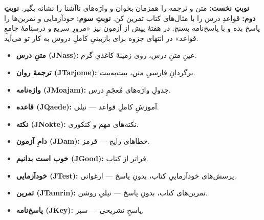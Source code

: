 \begin{JGood}
\textbf{نوبتِ نخست:} متن و ترجمه را همزمان بخوان و واژه‌های ناآشنا را نشانه بگیر.
\textbf{نوبتِ دوم:} قواعدِ درس را با مثال‌های کتاب تمرین کن. \textbf{نوبتِ سوم:}
خودآزمایی و تمرین‌ها را پاسخ بده و با پاسخ‌نامه بسنج. در هفتهٔ پیش از آزمون نیز
«مرورِ سریع و درسنامهٔ جامعِ قواعد» در انتهای جزوه برای بازبینیِ کاملِ دروس به
کار تو می‌آید.
\end{JGood}

\begin{JLegend}
\begin{itemize}
  \item \textbf{متنِ درس (JNass):} عینِ متنِ درس، روی زمینهٔ کاغذیِ گرم.
  \item \textbf{ترجمهٔ روان (JTarjome):} برگردانِ فارسیِ متن، بیت‌به‌بیت.
  \item \textbf{واژه‌نامه (JMoajam):} جدولِ واژه‌های مُعجَمِ درس.
  \item \textbf{قاعده (JQaede):} آموزشِ کاملِ قواعد — نیلی.
  \item \textbf{نکته (JNokte):} نکته‌های مهم و کنکوری.
  \item \textbf{دامِ آزمون (JDam):} خطاهای رایج — قرمز.
  \item \textbf{خوب است بدانیم (JGood):} فراتر از کتاب.
  \item \textbf{خودآزمایی (JTest):} پرسش‌های خودآزماییِ کتاب، بدونِ پاسخ — ارغوانی.
  \item \textbf{تمرین (JTamrin):} تمرین‌های کتاب، بدونِ پاسخ — نیلیِ روشن.
  \item \textbf{پاسخ‌نامه (JKey):} پاسخِ تشریحی — سبز.
\end{itemize}
\end{JLegend}
